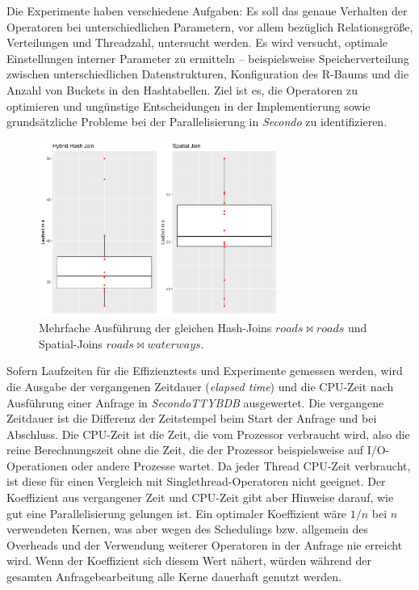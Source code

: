 \documentclass[a4paper,12pt,twoside]{article}
\newcommand{\Fb}[1]{\textit{#1}} %
\begin{document}
Die Experimente haben verschiedene Aufgaben: Es soll das genaue Verhalten der Operatoren bei unterschiedlichen Parametern, vor allem bezüglich Relationsgröße, Verteilungen und Threadzahl, untersucht werden. Es wird versucht, optimale Einstellungen interner Parameter zu ermitteln -- beispielsweise Speicherverteilung zwischen unterschiedlichen Datenstrukturen, Konfiguration des R-Baums und die Anzahl von Buckets in den Hashtabellen. Ziel ist es, die Operatoren zu optimieren und ungünstige Entscheidungen in der Implementierung sowie grundsätzliche Probleme bei der Parallelisierung in \Fb{Secondo} zu identifizieren.

\begin{figure}
	\centering
	\includegraphics[width=0.70\textwidth]{Bilder/streuung.png}
	\caption{Mehrfache Ausführung der gleichen Hash-Joins $roads \bowtie roads$ und Spatial-Joins $roads \bowtie waterways$.}
	\label{img:streuung}
\end{figure}

Sofern Laufzeiten für die Effizienztests und Experimente gemessen werden, wird die Ausgabe der vergangenen Zeitdauer (\Fb{elapsed time}) und die CPU-Zeit nach Ausführung einer Anfrage in \Fb{SecondoTTYBDB} ausgewertet. Die vergangene Zeitdauer ist die Differenz der Zeitstempel beim Start der Anfrage und bei Abschluss. Die CPU-Zeit ist die Zeit, die vom Prozessor verbraucht wird, also die reine Berechnungszeit ohne die Zeit, die der Prozessor beispielsweise auf I/O-Operationen oder andere Prozesse wartet. Da jeder Thread CPU-Zeit verbraucht, ist diese für einen Vergleich mit Singlethread-Operatoren nicht geeignet. Der Koeffizient aus vergangener Zeit und CPU-Zeit gibt aber Hinweise darauf, wie gut eine Parallelisierung gelungen ist. Ein optimaler Koeffizient wäre $1 / n$ bei $n$ verwendeten Kernen, was aber wegen des Schedulings bzw. allgemein des Overheads und der Verwendung weiterer Operatoren in der Anfrage nie erreicht wird. Wenn der Koeffizient sich diesem Wert nähert, würden während der gesamten Anfragebearbeitung alle Kerne dauerhaft genutzt werden.
\end{document}
